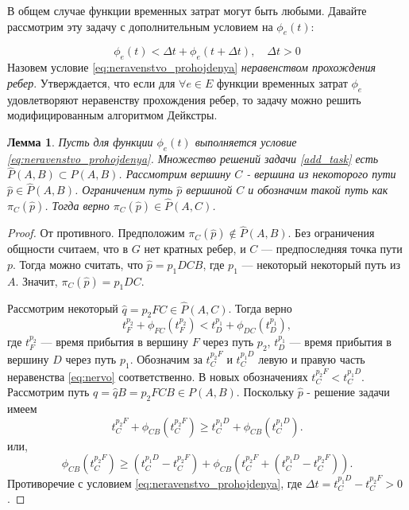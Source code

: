 \documentclass[12pt, a4paper]{article}
\newtheorem{lemma}{Лемма}[section]
\begin{document}
	В общем случае функции временных затрат могут быть любыми. Давайте рассмотрим эту задачу с дополнительным условием на $\phi_e(t):$
	
	\begin{equation}
		\label{eq:neravenstvo_prohojdenya}
		\phi_e(t) <\Delta t + \phi_e(t + \Delta t), \quad \Delta t > 0
	\end{equation}
	Назовем условие \ref{eq:neravenstvo_prohojdenya} \textit{неравенством прохождения ребер}. Утверждается, что если для $\forall e \in E$ функции временных затрат $\phi_e$ удовлетворяют неравенству прохождения ребер, то задачу можно решить модифицированным алгоритмом Дейкстры.
	
		\begin{lemma}
		\label{lemma:uslovie}
		Пусть для функции $\phi_e(t)$ выполняется условие \eqref{eq:neravenstvo_prohojdenya}. Множество решений задачи \eqref{add_task} есть $\widehat{P} (A, B) \subset P (A, B)$. Рассмотрим вершину $C$ - вершина из некоторого пути $\widehat{p} \in \widehat{P} (A, B)$. Ограниченим  путь $\widehat{p}$ вершиной $C$ и обозначим такой путь как  $\pi_C(\widehat{p})$. Тогда верно $\pi_C(\widehat{p}) \in \widehat{P} (A, C)$.  
	\end{lemma}
	
	\begin{proof}
		От противного. Предположим $\pi_C(\widehat{p}) \notin \widehat{P} (A, B)$. Без ограничения общности считаем, что в $G$ нет кратных ребер, и $C$ --- предпоследняя точка пути $p$. Тогда можно считать, что $\widehat{p} = p_1DCB$, где $p_1$ --- некоторый некоторый путь из $A$. Значит, $\pi_C(\widehat{p}) = p_1DC$. 
		
		Рассмотрим некоторый $\widehat{q} = p_2FC \in \widehat{P} (A, C)$. Тогда верно
		\begin{equation}
			\label{eq:nervo}
			t_F^{p_2} + \phi_{FC}(t_F^{p_2}) < t_D^{p_1} + \phi_{DC}(t_D^{p_1}),
		\end{equation}
		где $t_F^{p_2}$ --- время прибытия в вершину $F$ через путь $p_2$, $t_D^{p_1}$ --- время прибытия в  вершину $D$ через путь $p_1$. Обозначим за $t_{C}^{p_2F}$ и $t_{C}^{p_1D}$ левую и правую часть неравенства \eqref{eq:nervo} соответственно. В новых обозначениях $t_{C}^{p_2F} < t_{C}^{p_1D}$.
		Рассмотрим путь $q = \widehat{q}B =  p_2FCB \in P (A, B)$. Поскольку $\widehat{p}$ - решение задачи имеем 
		\begin{equation*}
			\label{eq:nervo_reshenie1}
			t_{C}^{p_2F} + \phi_{CB}(t_{C}^{p_2F}) \ge t_{C}^{p_1D} + \phi_{CB}(t_{C}^{p_1D}).
		\end{equation*}
		или, 
		\begin{equation}
			\label{eq:nervo_reshenie2}
			\phi_{CB}\left(t_{C}^{p_2F}\right) \ge \left(t_{C}^{p_1D} - t_{C}^{p_2F}\right) + \phi_{CB}\left(t_{C}^{p_2F} + \left(t_{C}^{p_1D} - t_{C}^{p_2F}\right)\right).
		\end{equation}
		Противоречие с условием \eqref{eq:neravenstvo_prohojdenya}, где $\Delta t = t_{C}^{p_1D} - t_{C}^{p_2F} > 0$.
	\end{proof}
	
\end{document}
